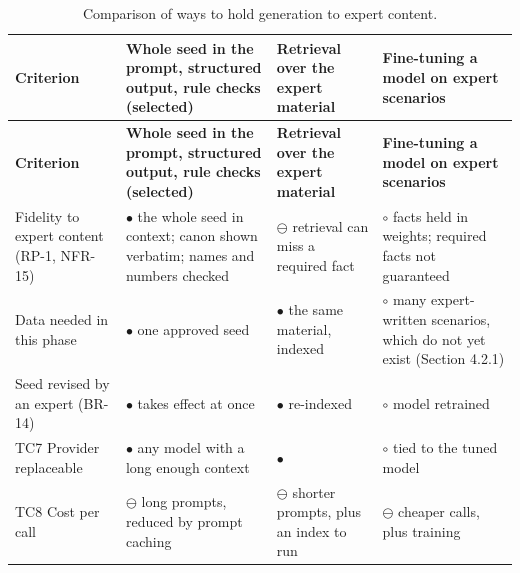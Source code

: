 {\small{}\renewcommand{\arraystretch}{1.1}
\begin{longtable}{|>{\raggedright\arraybackslash}p{}|>{\raggedright\arraybackslash}p{}|>{\raggedright\arraybackslash}p{}|>{\raggedright\arraybackslash}p{}|}
\caption{Comparison of ways to hold generation to expert content.} \\
\hline
\textbf{Criterion} & \textbf{Whole seed in the prompt, structured output, rule checks (selected)} & \textbf{Retrieval over the expert material} & \textbf{Fine-tuning a model on expert scenarios} \\ \hline
\endfirsthead
\hline
\textbf{Criterion} & \textbf{Whole seed in the prompt, structured output, rule checks (selected)} & \textbf{Retrieval over the expert material} & \textbf{Fine-tuning a model on expert scenarios} \\ \hline
\endhead
Fidelity to expert content (RP-1, NFR-15) & $\bullet$ the whole seed in context; canon shown verbatim; names and numbers checked\cite{r120,r121} & $\ominus$ retrieval can miss a required fact & $\circ$ facts held in weights; required facts not guaranteed \\ \hline
Data needed in this phase & $\bullet$ one approved seed & $\bullet$ the same material, indexed & $\circ$ many expert-\allowbreak{}written scenarios, which do not yet exist (Section 4.2.1) \\ \hline
Seed revised by an expert (BR-14) & $\bullet$ takes effect at once & $\bullet$ re-indexed & $\circ$ model retrained \\ \hline
TC7 Provider replaceable & $\bullet$ any model with a long enough context & $\bullet$ & $\circ$ tied to the tuned model \\ \hline
TC8 Cost per call & $\ominus$ long prompts, reduced by prompt caching & $\ominus$ shorter prompts, plus an index to run & $\ominus$ cheaper calls, plus training \\ \hline
\end{longtable}
}

